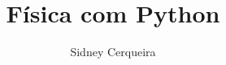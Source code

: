 \documentclass[12pt,openright,twoside,a4paper]{book}
\begin{document}
\frontmatter
\title{Física com Python}
\author{Sidney Cerqueira}
\date{\the\year}
\maketitle
\tableofcontents

\mainmatter
\setcounter{chapter}{-1}



% 
% 

\backmatter

\end{document}
